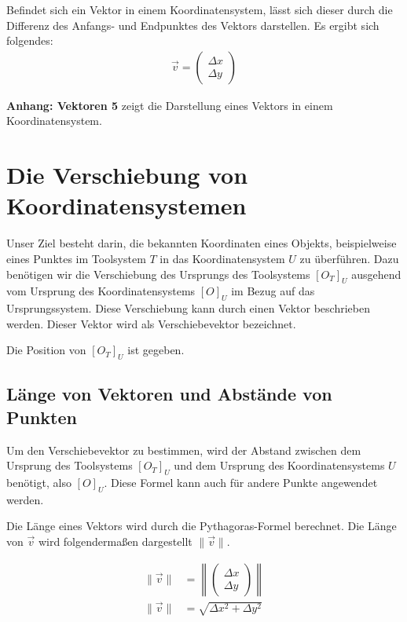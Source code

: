 \documentclass{article}
\newcommand{\m}[1]{\begin{pmatrix}#1\end{pmatrix}}
\begin{document}
    Befindet sich ein Vektor in einem Koordinatensystem, lässt sich dieser durch die Differenz
    des Anfangs- und Endpunktes des Vektors darstellen.
    Es ergibt sich folgendes: 
    \[
        \begin{split}
            \vec{v} = \m{\Delta{x} \\ \Delta{y}}
        \end{split}
    \]

    \textbf{Anhang: Vektoren 5} zeigt die Darstellung eines Vektors in einem Koordinatensystem.
    

    \section{Die Verschiebung von Koordinatensystemen}
    
    Unser Ziel besteht darin, die bekannten Koordinaten eines Objekts, beispielweise eines Punktes
    im Toolsystem $T$ in das Koordinatensystem $U$ zu überführen.
    Dazu benötigen wir die Verschiebung des Ursprungs des Toolsystems ${[{O}_{T}]}_{U}$ ausgehend vom 
    Ursprung des Koordinatensystems ${[O]}_{U}$ im Bezug auf das Ursprungssystem.
    Diese Verschiebung kann durch einen Vektor beschrieben werden.
    Dieser Vektor wird als Verschiebevektor bezeichnet.


    Die Position von ${[{O}_{T}]}_{U}$ ist gegeben.

    \subsection{Länge von Vektoren und Abstände von Punkten}
    Um den Verschiebevektor zu bestimmen, wird der Abstand zwischen dem Ursprung
    des Toolsystems ${[{O}_{T}]}_{U}$ und dem Ursprung des Koordinatensystems $U$ benötigt,
    also ${[O]}_{U}$. Diese Formel kann auch für andere Punkte angewendet werden.
    
    Die Länge eines Vektors wird durch die Pythagoras-Formel berechnet.
    Die Länge von $\vec{v}$ wird folgendermaßen dargestellt $\lVert \vec{v} \rVert$. 
    

    \[
        \begin{split}
            \lVert \vec{v} \rVert &= \left \lVert \m{\Delta x \\ \Delta y} \right \rVert \\
            \lVert \vec{v} \rVert &= \sqrt{\Delta{x}^2 + \Delta{y}^2}
        \end{split}
    \]
\end{document}

